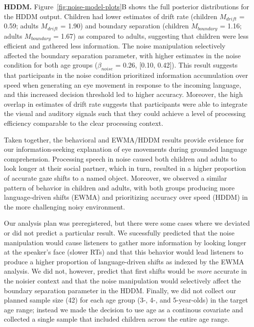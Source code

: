 \documentclass[,man,floatsintext]{apa6}
\begin{document}
\textbf{HDDM.} Figure~\ref{fig:noise-model-plots}B shows the full
posterior distributions for the HDDM output. Children had lower
estimates of drift rate (children \(M_{drift}\) = 0.59; adults
\(M_{drift}\) = 1.90) and boundary separation (children \(M_{boundary}\)
= 1.16; adults \(M_{boundary}\) = 1.67) as compared to adults,
suggesting that children were less efficient and gathered less
information. The noise manipulation selectively affected the boundary
separation parameter, with higher estimates in the noise condition for
both age groups (\(\beta_{noise}\) = 0.26, {[}0.10, 0.42{]}). This
result suggests that participants in the noise condition prioritized
information accumulation over speed when generating an eye movement in
response to the incoming language, and this increased decision threshold
led to higher accuracy. Moreover, the high overlap in estimates of drift
rate suggests that participants were able to integrate the visual and
auditory signals such that they could achieve a level of processing
efficiency comparable to the clear processing context.

Taken together, the behavioral and EWMA/HDDM results provide evidence
for our information-seeking explanation of eye movements during grounded
language comprehension. Processing speech in noise caused both children
and adults to look longer at their social partner, which in turn,
resulted in a higher proportion of accurate gaze shifts to a named
object. Moreover, we observed a similar pattern of behavior in children
and adults, with both groups producing more language-driven shifts
(EWMA) and prioritizing accuracy over speed (HDDM) in the more
challenging noisy environment.

Our analysis plan was preregistered, but there were some cases where we
deviated or did not predict a particular result. We sucessfully
predicted that the noise manipulation would cause listeners to gather
more information by looking longer at the speaker's face (slower RTs)
and that this behavior would lead listeners to produce a higher
proportion of language-driven shifts as indexed by the EWMA analysis. We
did not, however, predict that first shifts would be \emph{more}
accurate in the noisier context and that the noise manipulation would
selectively affect the boundary separation parameter in the HDDM.
Finally, we did not collect our planned sample size (42) for each age
group (3-, 4-, and 5-year-olds) in the target age range; instead we made
the decision to use age as a continous covariate and collected a single
sample that included children across the entire age range.
\end{document}

